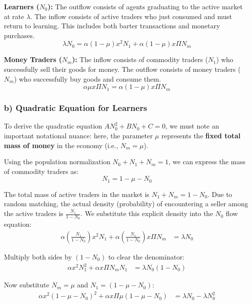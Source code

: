 \documentclass[11pt, a4paper]{article}
\begin{document}
\textbf{Learners ($N_0$):}
The outflow consists of agents graduating to the active market at rate $\lambda$. The inflow consists of active traders who just consumed and must return to learning. This includes both barter transactions and monetary purchases.
\begin{equation}
    \lambda N_0 = \alpha(1-\mu)x^2 N_1 + \alpha(1-\mu)x\Pi N_m
\end{equation}

\textbf{Money Traders ($N_m$):}
The inflow consists of commodity traders ($N_1$) who successfully sell their goods for money. The outflow consists of money traders ($N_m$) who successfully buy goods and consume them.
\begin{equation}
    \alpha\mu x\Pi N_1 = \alpha(1-\mu)x\Pi N_m
\end{equation}

\subsubsection*{b) Quadratic Equation for Learners}
To derive the quadratic equation $AN_0^2 + BN_0 + C = 0$, we must note an important notational nuance: here, the parameter $\mu$ represents the \textbf{fixed total mass of money} in the economy (i.e., $N_m = \mu$). 

Using the population normalization $N_0 + N_1 + N_m = 1$, we can express the mass of commodity traders as:
\[ N_1 = 1 - \mu - N_0 \]

The total mass of active traders in the market is $N_1 + N_m = 1 - N_0$. Due to random matching, the actual density (probability) of encountering a seller among the active traders is $\frac{N_1}{1-N_0}$. We substitute this explicit density into the $N_0$ flow equation:
\begin{align*}
    \alpha \left( \frac{N_1}{1 - N_0} \right) x^2 N_1 + \alpha \left( \frac{N_1}{1 - N_0} \right) x\Pi N_m &= \lambda N_0
\end{align*}

Multiply both sides by $(1 - N_0)$ to clear the denominator:
\begin{align*}
    \alpha x^2 N_1^2 + \alpha x\Pi N_m N_1 &= \lambda N_0 (1 - N_0)
\end{align*}

Now substitute $N_m = \mu$ and $N_1 = (1 - \mu - N_0)$:
\begin{align*}
    \alpha x^2 (1 - \mu - N_0)^2 + \alpha x\Pi \mu (1 - \mu - N_0) &= \lambda N_0 - \lambda N_0^2
\end{align*}
\end{document}
